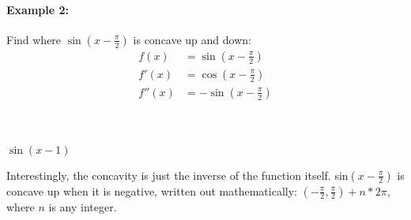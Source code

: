 \documentclass[../revisedmain.tex]{subfiles}
\begin{document}
\paragraph{Example 2:}Find where \(\sin(x-\frac{\pi}{2})\) is concave up and down:
\begin{equation}
	\begin{split}
	f(x)&=\sin(x-\frac{\pi}{2})\\
	f'(x)&=\cos(x-\frac{\pi}{2})\\
	f''(x)&=-\sin(x-\frac{\pi}{2})\\
	\end{split}
\end{equation}
	\\
\begin{center}
	\small{\(\sin(x-1)\)}
\end{center}
\par Interestingly, the concavity is just the inverse of the function itself. sin\((x-\frac{\pi}{2})\) is concave up when it is negative, written out mathematically: \((-\frac{\pi}{2},\frac{\pi}{2})+n*2\pi\), where \(n\) is any integer.\\\\
\end{document}
